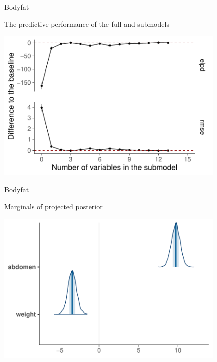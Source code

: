 \documentclass[english,t]{beamer}
\begin{document}
\begin{frame}
  
  {\Large\color{navyblue} Bodyfat}

  The predictive performance of the full and submodels
  
  \includegraphics[width=11cm]{bodyfat_varsel_plot.pdf}

\end{frame}


\begin{frame}
  
  {\Large\color{navyblue} Bodyfat}

  Marginals of projected posterior
  
  \includegraphics[width=11cm]{bodyfat_proj_mcmc_areas.pdf}

\end{frame}
\end{document}
